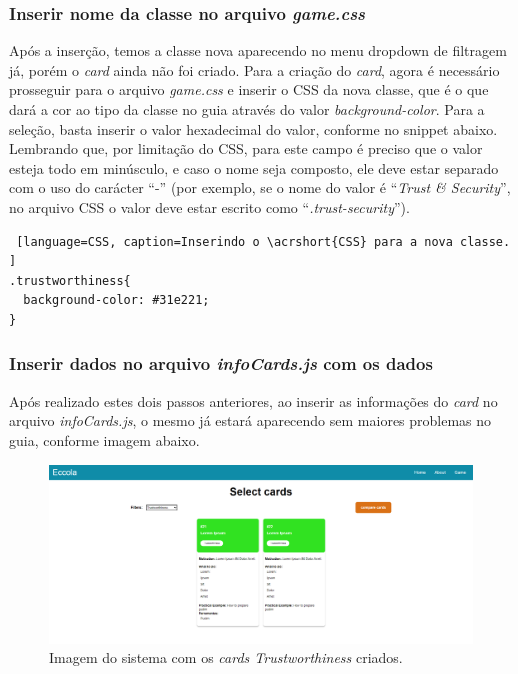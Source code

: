 \subsubsection{Inserir nome da classe no arquivo \textit{game.css}}
Após a inserção, temos a classe nova aparecendo no menu dropdown de filtragem já, porém o \textit{card} ainda não foi criado. Para a criação do \textit{card}, agora é necessário prosseguir para o arquivo \textit{game.css} e inserir o \acrshort{CSS} da nova classe, que é o que dará a cor ao tipo da classe no guia através do valor \textit{background-color}. Para a seleção, basta inserir o valor hexadecimal do valor, conforme no snippet abaixo. Lembrando que, por limitação do \acrshort{CSS}, para este campo é preciso que o valor esteja todo em minúsculo, e caso o nome seja composto, ele deve estar separado com o uso do carácter ``-'' (por exemplo, se o nome do valor é ``\textit{Trust \& Security}'', no arquivo \acrshort{CSS} o valor deve estar escrito como ``\textit{.trust-security}''). 

\begin{lstlisting} [language=CSS, caption=Inserindo o \acrshort{CSS} para a nova classe. ]
.trustworthiness{
  background-color: #31e221;
}
\end{lstlisting}

\subsubsection{Inserir dados no arquivo \textit{infoCards.js} com os dados}
\label{inserir dados}
Após realizado estes dois passos anteriores, ao inserir as informações do \textit{card} no arquivo \textit{infoCards.js}, o mesmo já estará aparecendo sem maiores problemas no guia, conforme imagem abaixo.

\begin{figure}[h!]
    \centering
    \includegraphics[width=\textwidth]{img/trustworthiness.png}
    \caption{Imagem do sistema com os \textit{cards Trustworthiness} criados.}
    \label{fig:trustworthiness}
\end{figure}


